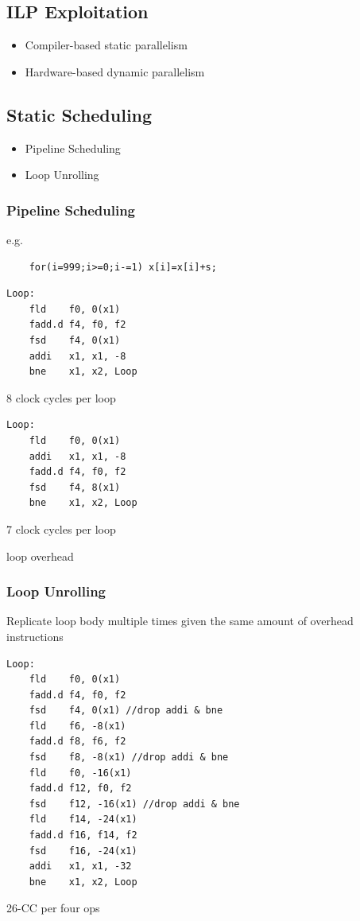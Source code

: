\subsection{ILP Exploitation}
\begin{itemize}
    \item Compiler-based static parallelism
    \item Hardware-based dynamic parallelism
\end{itemize}


\subsection{Static Scheduling}
\begin{itemize}
    \item Pipeline Scheduling
    \item Loop Unrolling
\end{itemize}

\subsubsection{Pipeline Scheduling}
e.g. 
\begin{verbatim}
    for(i=999;i>=0;i-=1) x[i]=x[i]+s;
\end{verbatim}

\begin{verbatim}
Loop:
    fld    f0, 0(x1)
    fadd.d f4, f0, f2
    fsd    f4, 0(x1)
    addi   x1, x1, -8
    bne    x1, x2, Loop
\end{verbatim}
8 clock cycles per loop

\begin{verbatim}
Loop:
    fld    f0, 0(x1)
    addi   x1, x1, -8
    fadd.d f4, f0, f2
    fsd    f4, 8(x1)
    bne    x1, x2, Loop
\end{verbatim}
7 clock cycles per loop

loop overhead

\subsubsection{Loop Unrolling}
Replicate loop body multiple times given the same amount of overhead instructions
\begin{verbatim}
Loop:
    fld    f0, 0(x1)
    fadd.d f4, f0, f2
    fsd    f4, 0(x1) //drop addi & bne
    fld    f6, -8(x1)
    fadd.d f8, f6, f2
    fsd    f8, -8(x1) //drop addi & bne
    fld    f0, -16(x1)
    fadd.d f12, f0, f2
    fsd    f12, -16(x1) //drop addi & bne
    fld    f14, -24(x1)
    fadd.d f16, f14, f2
    fsd    f16, -24(x1)
    addi   x1, x1, -32
    bne    x1, x2, Loop
\end{verbatim}
26-CC per four ops

